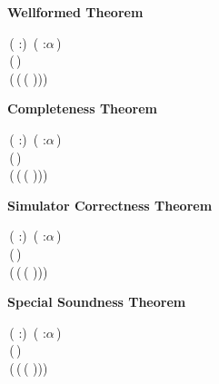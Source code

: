 \textbf{Wellformed Theorem}
\begin{holmath}
    \,( :)\,\HOLSymConst{\HOLTokenConj{}}\,\,( :\ensuremath{\alpha}\,)\,\HOLSymConst{\HOLTokenConj{}}\,\,\,\HOLSymConst{\HOLTokenConj{}}\\
\,(\,)\,\HOLSymConst{=}\,\,\HOLSymConst{\HOLTokenImp{}}\\
\,(\,(\,(\,\,)))
\end{holmath}  

\textbf{Completeness Theorem}
\begin{holmath}
    \,( :)\,\HOLSymConst{\HOLTokenConj{}}\,\,( :\ensuremath{\alpha}\,)\,\HOLSymConst{\HOLTokenConj{}}\,\,\,\HOLSymConst{\HOLTokenConj{}}\\
\,(\,)\,\HOLSymConst{=}\,\,\HOLSymConst{\HOLTokenImp{}}\\
\,(\,(\,(\,\,)))
\end{holmath}  

\textbf{Simulator Correctness Theorem}
\begin{holmath}
    \,( :)\,\HOLSymConst{\HOLTokenConj{}}\,\,( :\ensuremath{\alpha}\,)\,\HOLSymConst{\HOLTokenConj{}}\,\,\,\HOLSymConst{\HOLTokenConj{}}\\
\,(\,)\,\HOLSymConst{=}\,\,\HOLSymConst{\HOLTokenImp{}}\\
\,(\,(\,(\,\,)))
\end{holmath}  

\textbf{Special Soundness Theorem}
\begin{holmath}
    \,( :)\,\HOLSymConst{\HOLTokenConj{}}\,\,( :\ensuremath{\alpha}\,)\,\HOLSymConst{\HOLTokenConj{}}\,\,\,\HOLSymConst{\HOLTokenConj{}}\\
\,(\,)\,\HOLSymConst{=}\,\,\HOLSymConst{\HOLTokenImp{}}\\
\,(\,(\,(\,\,)))
\end{holmath}  


